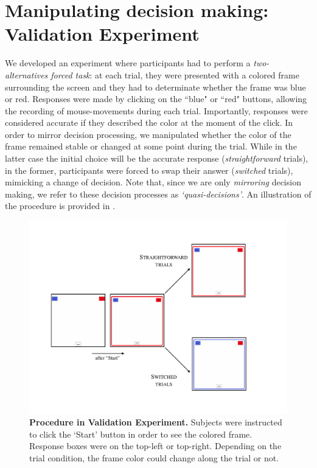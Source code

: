 \documentclass{article}
\begin{document}
\section{Manipulating decision making: Validation Experiment}
\label{section:validation}

We developed an experiment where participants had to perform a \emph{two-alternatives forced task}: at each trial, they were presented with a colored frame surrounding the screen and they had to determinate whether the frame was blue or red. 
Responses were made by clicking on the ``blue" or ``red" buttons, allowing the recording of mouse-movements during each trial. Importantly, responses were considered accurate if they described the color at the moment of the click. 
In order to mirror decision processing, we manipulated whether the color of the frame remained stable or changed at some point during the trial. 
While in the latter case the initial choice will be the accurate response (\textit{straightforward} trials), in the former, participants were forced to swap their answer (\textit{switched} trials), mimicking a change of decision. Note that, since we are only \emph{mirroring} decision making, we refer to these decision processes as \emph{`quasi-decisions'}.   
An illustration of the procedure is provided in . 



\begin{figure}
\centering
\includegraphics[scale=.5]{procedure.pdf}
\caption{\textbf{Procedure in Validation Experiment.} Subjects were instructed to click the `Start' button in order to see the colored frame. Response boxes were on the top-left or top-right. Depending on the trial condition, the frame color could change along the trial or not.} \label{fig:procedure.example}
\end{figure}
\end{document}

